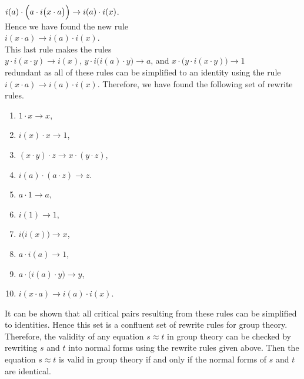$i(a) \cdot \Bigl(a \cdot i\bigl(x \cdot a\bigr)\Bigr) \rightarrow i(a) \cdot i(x)$.
\\[0.2cm]
Hence we have found the new rule
\\[0.2cm]
\hspace*{1.3cm}
$i(x \cdot a) \rightarrow i(a) \cdot i(x)$.
\\[0.2cm]
This last rule makes the rules
\\[0.2cm]
\hspace*{1.3cm}
$y \cdot i(x \cdot y) \rightarrow i(x)$, \quad
$y \cdot i\bigl(i(a)\cdot y\bigr) \rightarrow a$, \quad and \quad
$x \cdot \bigl(y \cdot i(x \cdot y)\bigr) \rightarrow 1$
\\[0.2cm]
redundant as all of these rules can be simplified to an identity using the rule $i(x \cdot a) \rightarrow i(a) \cdot i(x)$.
Therefore, we have found the following set of rewrite rules.
\begin{enumerate}
\item $1 \cdot x \rightarrow x$,
\item $i(x) \cdot x \rightarrow 1$, 
\item $(x \cdot y) \cdot z \rightarrow x \cdot (y \cdot z)$,
\item $i(a) \cdot (a \cdot z) \rightarrow z$.
\item $a \cdot 1 \rightarrow a$,
\item $i(1) \rightarrow 1$,
\item $i\bigl(i(x)\bigr) \rightarrow x$,
\item $a \cdot i(a) \rightarrow 1$,
\item $a \cdot \bigl(i(a) \cdot y\bigr) \rightarrow y$,
\item $i(x \cdot a) \rightarrow i(a) \cdot i(x)$.
\end{enumerate}
It can be shown that all critical pairs resulting from these rules can be simplified to identities.  Hence this
set is a confluent set of rewrite rules for group theory.  Therefore, the validity of any equation $s \approx t$
in group theory can be checked by rewriting $s$ and $t$ into normal forms using the rewrite rules given  
above.  Then the equation $s \approx t$ is valid in group theory if and only if the normal forms of $s$ and $t$
are identical. 
\eoxs

